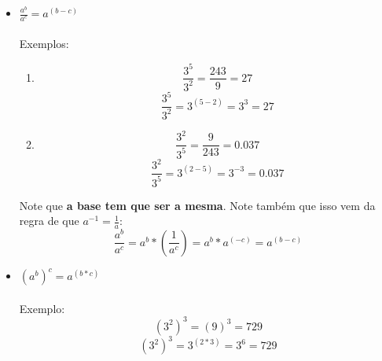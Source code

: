 \documentclass[11pt]{article}
\begin{document}
\begin{itemize}
	\item $\frac{a^b}{a^c} = a^{(b - c)}$
	\paragraph{}
	Exemplos:
	\begin{enumerate}
		\item 
		$$\frac{3^5}{3^2} = \frac{243}{9} = 27$$	
		$$\frac{3^5}{3^2} = 3^{(5-2)} = 3^3 = 27$$	
		\item
		$$\frac{3^2}{3^5} = \frac{9}{243} = 0.037$$	
		$$\frac{3^2}{3^5} = 3^{(2-5)} = 3^{-3} = 0.037$$	
	\end{enumerate}
	Note que \textbf{a base tem que ser a mesma}. Note também que isso vem da
	regra de que $a^{-1} = \frac{1}{a}$:
	$$\frac{a^b}{a^c} = a^b*(\frac{1}{a^c}) = a^b*a^{(-c)} = a^{(b-c)}$$

	\item ${(a^b)}^c = a^{(b*c)}$
	\paragraph{}
	Exemplo:
	$${(3^2)}^3 = {(9)}^3 = 729$$
	$${(3^2)}^3 = 3^{(2*3)} = 3^6 = 729$$
\end{itemize}
\end{document}
